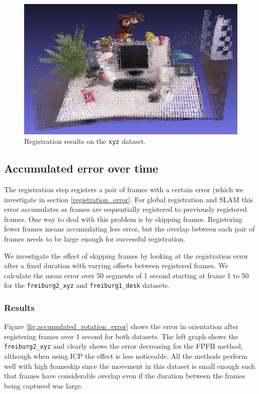 \documentclass[a4paper]{article}
\begin{document}
\begin{figure}[htbp]
    \centering
        \includegraphics[width=\textwidth]{ims/xyz_results.png}
    \caption{Registration results on the \texttt{xyz} dataset.}
    \label{fig:xyz_results}
\end{figure}

\subsection{Accumulated error over time}
\label{accumulated_error}

The registration step registers a pair of frames with a certain error (which we investigate in section \ref{registration_error}. For global registration and \ac{SLAM} this error accumulates as frames are sequentially registered to previously registered frames. One way to deal with this problem is by skipping frames. Registering fewer frames means accumulating less error, but the overlap between each pair of frames needs to be large enough for successful registration. 

We investigate the effect of skipping frames by looking at the registration error after a fixed duration with varying offsets between registered frames. We calculate the mean error over 50 segments of 1 second starting at frame 1 to 50 for the \texttt{freiburg2\_xyz} and \texttt{freiburg1\_desk} datasets.

\subsubsection{Results}

Figure \ref{fig:accumulated_rotation_error} shows the error in orientation after registering frames over 1 second for both datasets. The left graph shows the \texttt{freiburg2\_xyz} and clearly shows the error decreasing for the \ac{FPFH} method, although when using \ac{ICP} the effect is less noticeable. All the methods perform well with high frameskip since the movement in this dataset is small enough such that frames have considerable overlap even if the duration between the frames being captured was large.
\end{document}
